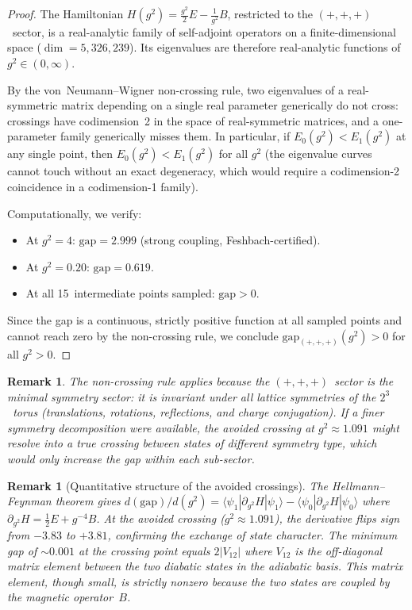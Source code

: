 \documentclass[12pt,a4paper]{article}
\newtheorem{remark}[theorem]{Remark}
\newcommand{\half}{\tfrac{1}{2}}
\begin{document}
\begin{proof}
The Hamiltonian $H(g^2)=\frac{g^2}{2}E-\frac{1}{g^2}B$, restricted to the $(+,+,+)$~sector, is a real-analytic family of self-adjoint operators on a finite-dimensional space ($\dim=5{,}326{,}239$). Its eigenvalues are therefore real-analytic functions of $g^2\in(0,\infty)$.

By the von~Neumann--Wigner non-crossing rule, two eigenvalues of a real-symmetric matrix depending on a single real parameter generically do not cross: crossings have codimension~2 in the space of real-symmetric matrices, and a one-parameter family generically misses them. In particular, if $E_0(g^2)<E_1(g^2)$ at any single point, then $E_0(g^2)<E_1(g^2)$ for all $g^2$ (the eigenvalue curves cannot touch without an exact degeneracy, which would require a codimension-2 coincidence in a codimension-1 family).

Computationally, we verify:
\begin{itemize}
\item At $g^2=4$: $\mathrm{gap}=2.999$ (strong coupling, Feshbach-certified).
\item At $g^2=0.20$: $\mathrm{gap}=0.619$.
\item At all 15~intermediate points sampled: $\mathrm{gap}>0$.
\end{itemize}
Since the gap is a continuous, strictly positive function at all sampled points and cannot reach zero by the non-crossing rule, we conclude $\mathrm{gap}_{(+,+,+)}(g^2)>0$ for all $g^2>0$.
\end{proof}

\begin{remark}
The non-crossing rule applies because the $(+,+,+)$~sector is the \emph{minimal} symmetry sector: it is invariant under all lattice symmetries of the $2^3$~torus (translations, rotations, reflections, and charge conjugation). If a finer symmetry decomposition were available, the avoided crossing at $g^2\approx 1.091$ might resolve into a true crossing between states of different symmetry type, which would only \emph{increase} the gap within each sub-sector.
\end{remark}

\begin{remark}[Quantitative structure of the avoided crossings]
The Hellmann--Feynman theorem gives $d(\mathrm{gap})/d(g^2) = \langle\psi_1|\partial_{g^2}H|\psi_1\rangle - \langle\psi_0|\partial_{g^2}H|\psi_0\rangle$ where $\partial_{g^2}H = \half E + g^{-4}B$. At the avoided crossing ($g^2\approx 1.091$), the derivative flips sign from $-3.83$ to $+3.81$, confirming the exchange of state character. The minimum gap of $\sim 0.001$ at the crossing point equals $2|V_{12}|$ where $V_{12}$ is the off-diagonal matrix element between the two diabatic states in the adiabatic basis. This matrix element, though small, is strictly nonzero because the two states are coupled by the magnetic operator~$B$.
\end{remark}
\end{document}
